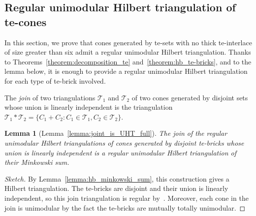 \documentclass[11pt,a4paper]{amsart}
\theoremstyle{plain}
\newtheorem{lemma}[theorem]{Lemma}
\theoremstyle{definition}
\newcommand{\cal}[1]{\mathcal{#1}}
\renewcommand{\cal}[1]{\mathcal{#1}}
\begin{document}
	\subsection{Regular unimodular Hilbert triangulation of te-cones}\label{section:RUHT}
	
	In this section, we prove that cones generated by te-sets with no thick te-interlace of size greater than six admit a regular unimodular Hilbert triangulation.
	Thanks to Theorems~\ref{theorem:decomposition_te} and~\ref{theorem:hb_te-bricks}, and to the lemma below, it is enough to provide a regular unimodular Hilbert triangulation for each type of te-brick involved.
	
	The \emph{join} of two triangulations $\cal T_1$ and $\cal T_2$ of two cones generated by disjoint sets whose union is linearly independent is the triangulation $\cal T_1 * \cal T_2 = \{C_1+C_2\colon C_1\in \cal T_1,C_2\in \cal T_2\}$.
	\begin{lemma}[Lemma~\ref{lemma:joint_is_UHT_full}]\label{lemma:join_is_UHT}
		The join of the regular unimodular Hilbert triangulations of cones generated by disjoint te-bricks whose union is linearly independent is a regular unimodular Hilbert triangulation of their Minkowski sum.
	\end{lemma} 

\begin{proof}[Sketch]
	By Lemma~\ref{lemma:hb_minkowski_sum}, this construction gives a Hilbert triangulation.
	The te-bricks are disjoint and their union is linearly independent, so this join triangulation is regular by~\cite[Sect.~2.3.2]{Haase_Paffenholz_Piechnik_Santos_2021}.
	Moreover, each cone in the join is unimodular by the fact the te-bricks are mutually totally unimodular.
	\end{proof}
\end{document}
